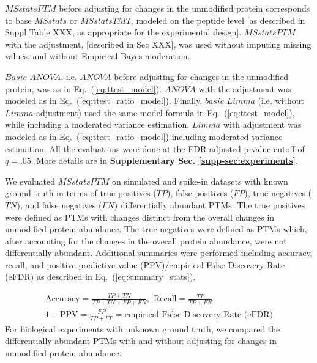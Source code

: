 \documentclass[mcp]{article}
\numberwithin{table}{section}
\def\todo#1{{\color{red}[#1]}}
\def\eqref#1{Eq.~(\ref{eq:#1})}
\begin{document}
$MSstatsPTM$ before adjusting for changes in the unmodified protein corresponds to base $MSstats$ or $MSstatsTMT$, modeled on the peptide level \todo{as described in Suppl Table XXX, as appropriate for the experimental design}. $MSstatsPTM$ with the adjustment, \todo{described in Sec XXX}, was used without imputing missing values, and without Empirical Bayes moderation.

$Basic$ $ANOVA$, i.e. $ANOVA$ before adjusting for changes in the unmodified protein, was as in \eqref{ttest_model}. $ANOVA$ with the adjustment was modeled as in \eqref{ttest_ratio_model}. 
Finally, $basic$ $Limma$ (i.e. without $Limma$ adjustment) used the same model formula in \eqref{ttest_model}, while including a moderated variance estimation. $Limma$ with adjustment was modeled as in \eqref{ttest_ratio_model} including moderated variance estimation.  
All the evaluations were done at the FDR-adjusted p-value cutoff of $q=.05$. More details are in {\bf Supplementary Sec. \ref{supp-sec:experiments}}. 

We evaluated $MSstatsPTM$ on simulated and spike-in datasets with known ground truth in terms of true positives ($TP$), false positives ($FP$), true negatives ($TN$), and false negatives ($FN$) differentially abundant PTMs. The true positives were defined as PTMs with changes distinct from the overall changes in unmodified protein abundance. The true negatives were defined as PTMs which, after accounting for the changes in the overall protein abundance, were not differentially abundant. Additional summaries were performed including accuracy, recall, and positive predictive value (PPV)/empirical False Discovery Rate (eFDR) as described in \eqref{summary_stats}. 

\begin{equation}\label{eq:summary_stats}
\begin{alignedat}{2}
&\text{Accuracy} = \frac{TP + TN}{TP+TN+FP+FN}, \text{ Recall} = \frac{TP}{TP+FN} & \\
&1 - \text{PPV} = \frac{FP}{TP+FP} = \text{empirical False Discovery Rate (eFDR)}
\end{alignedat}
\end{equation}
For biological experiments with unknown ground truth, we compared the differentially abundant PTMs with and without adjusting for changes in unmodified protein abundance. 

\end{document}
